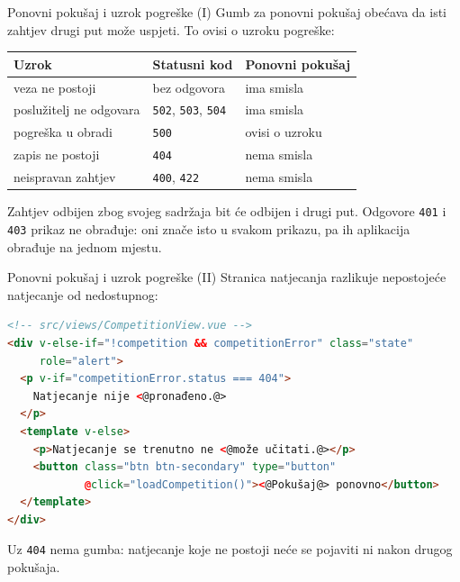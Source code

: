 \begin{frame}{Ponovni pokušaj i uzrok pogreške (I)}
Gumb za ponovni pokušaj obećava da isti zahtjev drugi put može uspjeti. To ovisi o uzroku pogreške:

\vspace{0.6em}
\begin{center}
{\small
\setlength{\tabcolsep}{6pt}
\renewcommand{\arraystretch}{1.35}
\begin{tabular}{@{}L{3.9cm}L{3.0cm}L{3.3cm}@{}}
  \toprule
  \textbf{Uzrok} & \textbf{Statusni kod} & \textbf{Ponovni pokušaj} \\
  \midrule
  veza ne postoji & bez odgovora & ima smisla \\
  poslužitelj ne odgovara & \texttt{502}, \texttt{503}, \texttt{504} & ima smisla \\
  pogreška u obradi & \texttt{500} & ovisi o uzroku \\
  zapis ne postoji & \texttt{404} & nema smisla \\
  neispravan zahtjev & \texttt{400}, \texttt{422} & nema smisla \\
  \bottomrule
\end{tabular}
}
\end{center}

\vspace{0.6em}
Zahtjev odbijen zbog svojeg sadržaja bit će odbijen i drugi put. Odgovore \texttt{401} i \texttt{403} prikaz ne obrađuje: oni znače isto u svakom prikazu, pa ih aplikacija obrađuje na jednom mjestu.
\end{frame}

\begin{frame}[fragile]{Ponovni pokušaj i uzrok pogreške (II)}
Stranica natjecanja razlikuje nepostojeće natjecanje od nedostupnog:

\begin{lstlisting}[language=html]
<!-- src/views/CompetitionView.vue -->
<div v-else-if="!competition && competitionError" class="state"
     role="alert">
  <p v-if="competitionError.status === 404">
    Natjecanje nije <@pronađeno.@>
  </p>
  <template v-else>
    <p>Natjecanje se trenutno ne <@može učitati.@></p>
    <button class="btn btn-secondary" type="button"
            @click="loadCompetition()"><@Pokušaj@> ponovno</button>
  </template>
</div>
\end{lstlisting}

\vspace{0.3em}
Uz \texttt{404} nema gumba: natjecanje koje ne postoji neće se pojaviti ni nakon drugog pokušaja.
\end{frame}

